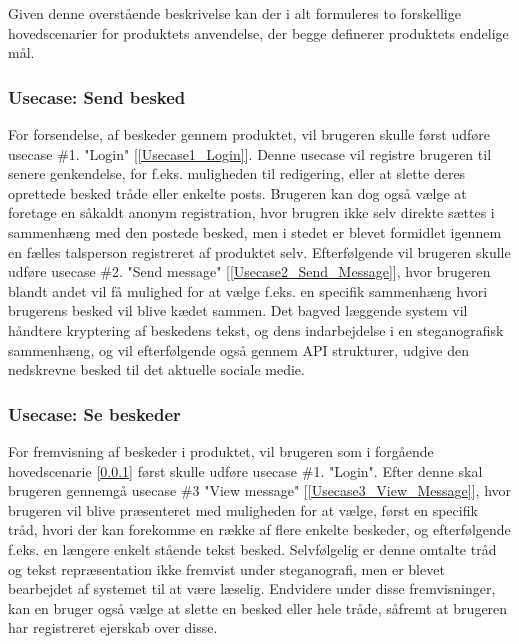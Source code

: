 Given denne overstående beskrivelse kan der i alt formuleres to forskellige hovedscenarier for produktets anvendelse, der begge definerer produktets endelige mål.
\subsubsection{Usecase: Send besked}
\label{Hovedscenarie1}
For forsendelse, af beskeder gennem produktet, vil brugeren skulle først udføre usecase \#1. "Login" [\ref{Usecase1_Login}]. Denne usecase vil registre brugeren til senere genkendelse, for f.eks. muligheden til redigering, eller at slette deres oprettede besked tråde eller enkelte posts. Brugeren kan dog også vælge at foretage en såkaldt anonym registration, hvor brugren ikke selv direkte sættes i sammenhæng med den postede besked, men i stedet er blevet formidlet igennem en fælles talsperson registreret af produktet selv. Efterfølgende vil brugeren skulle udføre usecase \#2. "Send message" [\ref{Usecase2_Send_Message}], hvor brugeren blandt andet vil få mulighed for at vælge f.eks. en specifik sammenhæng hvori brugerens besked vil blive kædet sammen. Det bagved læggende system vil håndtere kryptering af beskedens tekst, og dens indarbejdelse i en steganografisk sammenhæng, og vil efterfølgende også gennem API strukturer, udgive den nedskrevne besked til det aktuelle sociale medie.
\subsubsection{Usecase: Se beskeder}
\label{Hovedscenarie2}
For fremvisning af beskeder i produktet, vil brugeren som i forgående hovedscenarie [\ref{Hovedscenarie1}] først skulle udføre usecase \#1. "Login". Efter denne skal brugeren gennemgå usecase \#3 "View message" [\ref{Usecase3_View_Message}], hvor brugeren vil blive præsenteret med muligheden for at vælge, først en specifik tråd, hvori der kan forekomme en række af flere enkelte beskeder, og efterfølgende f.eks. en længere enkelt stående tekst besked.
Selvfølgelig er denne omtalte tråd og tekst repræsentation ikke fremvist under steganografi, men er blevet bearbejdet af systemet til at være læselig.
Endvidere under disse fremvisninger, kan en bruger også vælge at slette en besked eller hele tråde, såfremt at brugeren har registreret ejerskab over disse.

